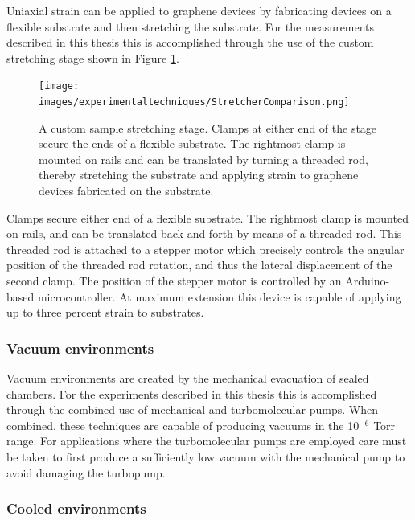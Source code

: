 \documentclass[edeposit,fullpage,draftthesis]{uiucthesis2009}
\begin{document}
        Uniaxial strain can be applied to graphene devices by fabricating devices on a flexible substrate
        and then stretching the substrate. For the measurements described in this thesis this 
        is accomplished through the use of the custom stretching stage shown in Figure \ref{fig:stretcher}.
        \begin{figure}
            \centering
            \texttt{[image: images/experimentaltechniques/StretcherComparison.png]}
            \caption[Custom sample stretching stage]{
                A custom sample stretching stage. Clamps at either end of the stage secure the ends
                of a flexible substrate. The rightmost clamp is mounted on rails and can be translated
                by turning a threaded rod, thereby stretching the substrate and applying strain
                to graphene devices fabricated on the substrate.
                }
            \label{fig:stretcher}
        \end{figure}
        Clamps secure either end of a flexible substrate. The rightmost clamp is mounted on rails,
        and can be translated back and forth by means of a threaded rod. This threaded rod is attached
        to a stepper motor which precisely controls the angular position of the threaded rod rotation,
        and thus the lateral displacement of the second clamp. The position of the stepper motor is
        controlled by an Arduino-based microcontroller.
        At maximum extension this device is capable of applying up to three percent strain to substrates. 
        
        \subsubsection*{Vacuum environments}
        
        Vacuum environments are created by the mechanical evacuation of sealed chambers. 
        For the experiments described in this thesis this is accomplished through the combined use
        of mechanical and turbomolecular pumps. 
        When combined, these techniques are capable of producing vacuums in the 10$^{-6}$ Torr range.
        For applications where the turbomolecular pumps are employed care must be taken to first produce a sufficiently 
        low vacuum with the mechanical pump to avoid damaging the turbopump.
        
        \subsubsection*{Cooled environments}
        
\end{document}
